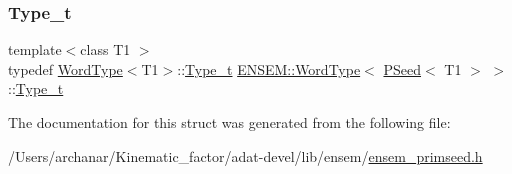 \subsubsection{\texorpdfstring{Type\_t}{Type\_t}\hspace{0.1cm}{\footnotesize\ttfamily [3/3]}}
{\footnotesize\ttfamily template$<$class T1 $>$ \\
typedef \mbox{\hyperlink{structENSEM_1_1WordType}{Word\+Type}}$<$T1$>$\+::\mbox{\hyperlink{structENSEM_1_1WordType_3_01PSeed_3_01T1_01_4_01_4_a7ec3ab016c8f9b1265ec9fe4ddf9053d}{Type\+\_\+t}} \mbox{\hyperlink{structENSEM_1_1WordType}{E\+N\+S\+E\+M\+::\+Word\+Type}}$<$ \mbox{\hyperlink{classENSEM_1_1PSeed}{P\+Seed}}$<$ T1 $>$ $>$\+::\mbox{\hyperlink{structENSEM_1_1WordType_3_01PSeed_3_01T1_01_4_01_4_a7ec3ab016c8f9b1265ec9fe4ddf9053d}{Type\+\_\+t}}}



The documentation for this struct was generated from the following file\+:\begin{DoxyCompactItemize}
\item 
/\+Users/archanar/\+Kinematic\+\_\+factor/adat-\/devel/lib/ensem/\mbox{\hyperlink{adat-devel_2lib_2ensem_2ensem__primseed_8h}{ensem\+\_\+primseed.\+h}}\end{DoxyCompactItemize}
